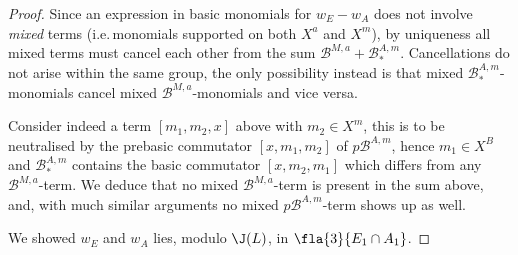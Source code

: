 \documentclass[a4paper,11pt,german,english]{article}
\begin{document}
\begin{proof}
Since an expression in basic monomials for $w_{E}-w_{A}$ does not involve
{\em mixed} terms (i.{}e.{\,}monomials supported on both $X^{a}$ and $X^{m}$), by uniqueness all mixed terms must cancel each other from the sum $\mathcal{B}^{M,a}+%
\mathcal{B}^{A,m}_{*}$. Cancellations do not arise within the same group, the only possibility
instead is that mixed $\mathcal{B}^{A,m}_{*}$-monomials cancel mixed $\mathcal{B}^{M,a}$-monomials and vice versa.

Consider indeed a term $[m_{1},m_{2},x]$ above with $m_{2}\in X^{m}$, %
this is to be neutralised by the prebasic commutator
$[x,m_{1},m_{2}]$ of $p\mathcal{B}^{A,m}$, hence $m_{1}\in X^{B}$ and $\mathcal{B}^{A,m}_{*}$ contains the basic commutator $[x,m_{2},m_{1}]$ which differs from any $\mathcal{B}^{M,a}$-term. We deduce that no mixed $\mathcal{B}^{M,a}$-term is present in the sum above, and, with much similar arguments no
mixed $p\mathcal{B}^{A,m}$-term shows up as well.

We showed $w_{E}$ and $w_{A}$ lies, modulo $\J(L)$, in $\fla{3}{E_{1}\cap A_{1}}$.
\end{proof}




\end{document}
